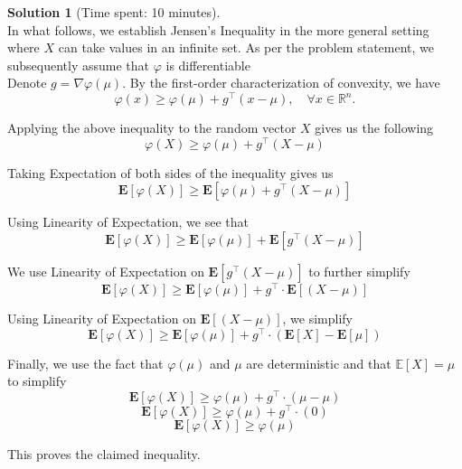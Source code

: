 \documentclass[11pt, reqno, letterpaper, twoside]{amsart}
\theoremstyle{plain}
\theoremstyle{definition}
\newtheorem{solution}[theorem]{Solution}
\begin{document}
\clearpage
\begin{solution}[Time spent: 10 minutes] \\
In what follows, we establish Jensen’s Inequality in the more general setting where $X$ can take values in an infinite set. As per the problem statement, we subsequently assume that $\varphi$ is differentiable \\

\noindent Denote \( g = \nabla \varphi(\mu) \).  
By the first-order characterization of convexity, we have
\[
\varphi(x)\geq \varphi(\mu) + g^\top (x - \mu), 
\quad \forall x \in \mathbb{R}^n.
\]

Applying the above inequality to the random vector \(X\) gives us the following
\[
\varphi(X)\ge \varphi(\mu)+ g^\top \left(X-\mu\right)
\]

Taking Expectation of both sides of the inequality gives us 
\[
\mathbf{E} \left[ \varphi(X) \right]\ge \mathbf{E} \left[ \varphi(\mu)+ g^\top \left(X-\mu\right) \right]
\]

Using Linearity of Expectation, we see that
\[
\mathbf{E} \left[ \varphi(X) \right]\ge \mathbf{E} \left[ \varphi(\mu) \right] + \mathbf{E} \left[ g^\top \left(X-\mu\right) \right]
\]

We use Linearity of Expectation on $\mathbf{E} \left[ g^\top \left(X-\mu\right) \right]$ to further simplify
\[
\mathbf{E} \left[ \varphi(X) \right]\ge \mathbf{E} \left[ \varphi(\mu) \right] + g^\top \cdot \mathbf{E} \left[\left(X-\mu\right) \right]
\]

Using Linearity of Expectation on $\mathbf{E} \left[\left(X-\mu\right) \right]$, we simplify 
\[
\mathbf{E} \left[ \varphi(X) \right]\ge \mathbf{E} \left[ \varphi(\mu) \right] + g^\top \cdot \left( \mathbf{E} \left[X \right] - \mathbf{E} \left[\mu \right] \right)
\]

Finally, we use the fact that $\varphi(\mu)$ and $\mu$ are deterministic and that \(\mathbb{E}[X]=\mu\) to simplify
\[
\mathbf{E} \left[ \varphi(X) \right]\ge \varphi(\mu) + g^\top \cdot \left( \mu - \mu \right)
\]
\[
\mathbf{E} \left[ \varphi(X) \right]\ge \varphi(\mu) + g^\top \cdot \left( 0 \right)
\]
\[
\mathbf{E} \left[ \varphi(X) \right]\ge \varphi(\mu)
\]

This proves the claimed inequality.

\end{solution}
\end{document}
